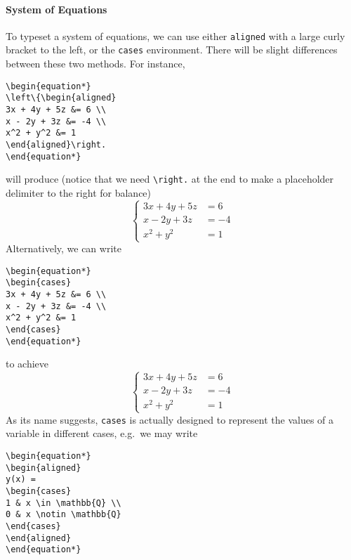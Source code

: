 \paragraph{System of Equations}
To typeset a system of equations, we can use either \texttt{aligned} with a large curly bracket to the left, or the \texttt{cases} environment. There will be slight differences between these two methods. For instance,
\begin{lstlisting}
\begin{equation*}
\left\{\begin{aligned}
3x + 4y + 5z &= 6 \\
x - 2y + 3z &= -4 \\
x^2 + y^2 &= 1
\end{aligned}\right.
\end{equation*}
\end{lstlisting}
will produce (notice that we need \texttt{\textbackslash right.} at the end to make a placeholder delimiter to the right for balance)
\begin{equation*}
\left\{\begin{aligned}
3x + 4y + 5z &= 6 \\
x - 2y + 3z &= -4 \\
x^2 + y^2 &= 1
\end{aligned}\right.
\end{equation*}
Alternatively, we can write
\begin{lstlisting}
\begin{equation*}
\begin{cases}
3x + 4y + 5z &= 6 \\
x - 2y + 3z &= -4 \\
x^2 + y^2 &= 1
\end{cases}
\end{equation*}
\end{lstlisting}
to achieve
\begin{equation*}
\begin{cases}
3x + 4y + 5z &= 6 \\
x - 2y + 3z &= -4 \\
x^2 + y^2 &= 1
\end{cases}
\end{equation*}
As its name suggests, \verb|cases| is actually designed to represent the values of a variable in different cases, e.g.\ we may write
\begin{lstlisting}
\begin{equation*}
\begin{aligned}
y(x) = 
\begin{cases}
1 & x \in \mathbb{Q} \\
0 & x \notin \mathbb{Q}
\end{cases}
\end{aligned}
\end{equation*}
\end{lstlisting}
